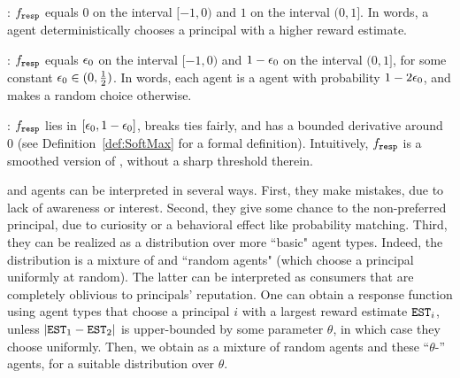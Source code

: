 \begin{OneLiners}
\item \HardMax: $f_{\mathtt{resp}}$ equals $0$ on the interval $[-1,0)$ and $1$
  on the interval $(0,1]$. In words, a \HardMax agent
  deterministically chooses a principal with a higher reward estimate.

\item \HardMaxRandom:
    $f_{\mathtt{resp}}$ equals $\epsilon_0$ on the interval $[-1,0)$ and $1-\epsilon_0$ on the interval $(0,1]$, for some constant $\epsilon_0\in (0,\tfrac12)$. In words, each agent is a \HardMax agent with probability $1-2\epsilon_0$, and makes a random choice otherwise.

\item \SoftMaxRandom: $f_{\mathtt{resp}}$  lies in $[\epsilon_0,1-\epsilon_0]$, breaks ties fairly, and has a bounded derivative around $0$ (see Definition~\ref{def:SoftMax} for a formal definition). Intuitively, $f_{\mathtt{resp}}$ is a smoothed version of \HardMaxRandom, without a sharp threshold therein.
\end{OneLiners}

\HardMaxRandom and \SoftMaxRandom agents can be interpreted in several ways. First, they make mistakes, due to lack of awareness or interest. Second, they give some chance to the non-preferred principal, due to curiosity or a behavioral effect like probability matching.
Third, they can be realized as a distribution over more ``basic" agent types. Indeed, the \HardMaxRandom distribution is a mixture of \HardMax and ``random agents" (which choose a principal uniformly at random). The latter can be interpreted as consumers that are completely oblivious to principals' reputation.
One can obtain a \SoftMaxRandom response function using agent types that choose a principal $i$ with a largest reward estimate $\mathtt{EST}_i$, unless $|\mathtt{EST}_1-\mathtt{EST}_2|$ is upper-bounded by some parameter $\theta$, in which case they choose uniformly. Then, we obtain \SoftMaxRandom as a mixture of random agents and these ``$\theta$-\HardMax'' agents, for a suitable distribution over $\theta$.


